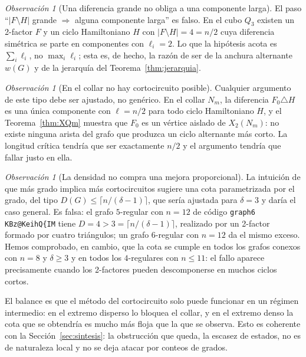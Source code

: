 \documentclass[11pt,a4paper]{article}
\theoremstyle{definition}
\theoremstyle{remark}
\newtheorem{observacion}[teorema]{Observación}
\begin{document}
\begin{observacion}[Una diferencia grande no obliga a una componente larga]\label{obs:fragmenta}
El paso ``$|F\setminus H|$ grande $\Rightarrow$ alguna componente larga'' es falso. En el cubo $Q_3$ existen un 2-factor $F$ y un ciclo Hamiltoniano $H$ con $|F\setminus H|=4=n/2$ cuya diferencia simétrica se parte en componentes con $\ell_i=2$. Lo que la hipótesis acota es $\sum_i\ell_i$, no $\max_i\ell_i$; esta es, de hecho, la razón de ser de la anchura alternante $w(G)$ y de la jerarquía del Teorema~\ref{thm:jerarquia}.
\end{observacion}

\begin{observacion}[En el collar no hay cortocircuito posible]\label{obs:nocorto}
Cualquier argumento de este tipo debe ser ajustado, no genérico. En el collar $N_m$, la diferencia $F_0\triangle H$ es una única componente con $\ell=n/2$ para todo ciclo Hamiltoniano $H$, y el Teorema~\ref{thm:XQm} muestra que $F_0$ es un vértice aislado de $X_2(N_m)$: no existe ninguna arista del grafo que produzca un ciclo alternante más corto. La longitud crítica tendría que ser exactamente $n/2$ y el argumento tendría que fallar justo en ella.
\end{observacion}

\begin{observacion}[La densidad no compra una mejora proporcional]\label{obs:nodensidad}
La intuición de que más grado implica más cortocircuitos sugiere una cota parametrizada por el grado, del tipo $D(G)\le\lceil n/(\delta-1)\rceil$, que sería ajustada para $\delta=3$ y daría el caso general. Es falsa: el grafo $5$-regular con $n=12$ de código \texttt{graph6} \verb|KBz@KeihQ{IM| tiene $D=4>3=\lceil n/(\delta-1)\rceil$, realizado por un 2-factor formado por cuatro triángulos; un grafo $6$-regular con $n=12$ da el mismo exceso. Hemos comprobado, en cambio, que la cota se cumple en todos los grafos conexos con $n=8$ y $\delta\ge3$ y en todos los $4$-regulares con $n\le11$: el fallo aparece precisamente cuando los 2-factores pueden descomponerse en muchos ciclos cortos.
\end{observacion}

El balance es que el método del cortocircuito solo puede funcionar en un régimen intermedio: en el extremo disperso lo bloquea el collar, y en el extremo denso la cota que se obtendría es mucho más floja que la que se observa. Esto es coherente con la Sección~\ref{sec:sintesis}: la obstrucción que queda, la escasez de estados, no es de naturaleza local y no se deja atacar por conteos de grados.
\end{document}
